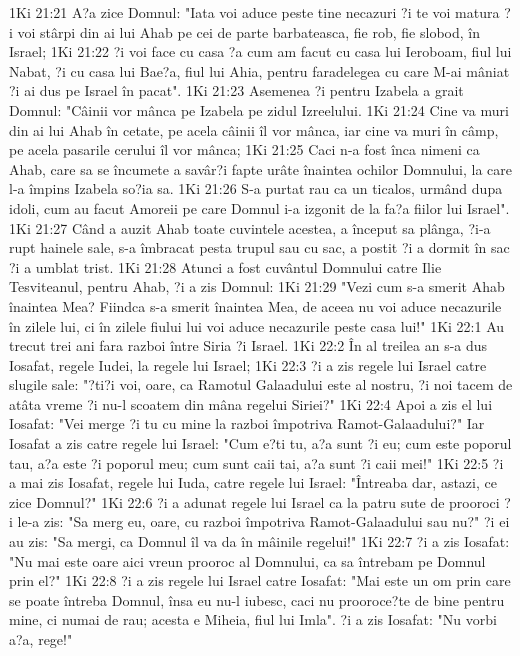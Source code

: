 1Ki 21:21  A?a zice Domnul: "Iata voi aduce peste tine necazuri ?i te voi matura ?i voi stârpi din ai lui Ahab pe cei de parte barbateasca, fie rob, fie slobod, în Israel;
1Ki 21:22  ?i voi face cu casa ?a cum am facut cu casa lui Ieroboam, fiul lui Nabat, ?i cu casa lui Bae?a, fiul lui Ahia, pentru faradelegea cu care M-ai mâniat ?i ai dus pe Israel în pacat".
1Ki 21:23  Asemenea ?i pentru Izabela a grait Domnul: "Câinii vor mânca pe Izabela pe zidul Izreelului.
1Ki 21:24  Cine va muri din ai lui Ahab în cetate, pe acela câinii îl vor mânca, iar cine va muri în câmp, pe acela pasarile cerului îl vor mânca;
1Ki 21:25  Caci n-a fost înca nimeni ca Ahab, care sa se încumete a savâr?i fapte urâte înaintea ochilor Domnului, la care l-a împins Izabela so?ia sa.
1Ki 21:26  S-a purtat rau ca un ticalos, urmând dupa idoli, cum au facut Amoreii pe care Domnul i-a izgonit de la fa?a fiilor lui Israel".
1Ki 21:27  Când a auzit Ahab toate cuvintele acestea, a început sa plânga, ?i-a rupt hainele sale, s-a îmbracat pesta trupul sau cu sac, a postit ?i a dormit în sac ?i a umblat trist.
1Ki 21:28  Atunci a fost cuvântul Domnului catre Ilie Tesviteanul, pentru Ahab, ?i a zis Domnul:
1Ki 21:29  "Vezi cum s-a smerit Ahab înaintea Mea? Fiindca s-a smerit înaintea Mea, de aceea nu voi aduce necazurile în zilele lui, ci în zilele fiului lui voi aduce necazurile peste casa lui!"
1Ki 22:1  Au trecut trei ani fara razboi între Siria ?i Israel.
1Ki 22:2  În al treilea an s-a dus Iosafat, regele Iudei, la regele lui Israel;
1Ki 22:3  ?i a zis regele lui Israel catre slugile sale: "?ti?i voi, oare, ca Ramotul Galaadului este al nostru, ?i noi tacem de atâta vreme ?i nu-l scoatem din mâna regelui Siriei?"
1Ki 22:4  Apoi a zis el lui Iosafat: "Vei merge ?i tu cu mine la razboi împotriva Ramot-Galaadului?" Iar Iosafat a zis catre regele lui Israel: "Cum e?ti tu, a?a sunt ?i eu; cum este poporul tau, a?a este ?i poporul meu; cum sunt caii tai, a?a sunt ?i caii mei!"
1Ki 22:5  ?i a mai zis Iosafat, regele lui Iuda, catre regele lui Israel: "Întreaba dar, astazi, ce zice Domnul?"
1Ki 22:6  ?i a adunat regele lui Israel ca la patru sute de prooroci ?i le-a zis: "Sa merg eu, oare, cu razboi împotriva Ramot-Galaadului sau nu?" ?i ei au zis: "Sa mergi, ca Domnul îl va da în mâinile regelui!"
1Ki 22:7  ?i a zis Iosafat: "Nu mai este oare aici vreun prooroc al Domnului, ca sa întrebam pe Domnul prin el?"
1Ki 22:8  ?i a zis regele lui Israel catre Iosafat: "Mai este un om prin care se poate întreba Domnul, însa eu nu-l iubesc, caci nu prooroce?te de bine pentru mine, ci numai de rau; acesta e Miheia, fiul lui Imla". ?i a zis Iosafat: "Nu vorbi a?a, rege!"
